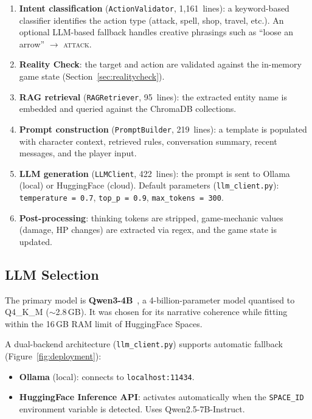 \documentclass[12pt,a4paper]{article}
\begin{document}
\begin{enumerate}[noitemsep]
    \item \textbf{Intent classification} (\texttt{ActionValidator},
          1,161~lines): a keyword-based classifier identifies the action type
          (attack, spell, shop, travel, etc.). An optional LLM-based fallback
          handles creative phrasings such as ``loose an arrow''
          $\rightarrow$ \textsc{attack}.
    \item \textbf{Reality Check}: the target and action are validated against
          the in-memory game state (Section~\ref{sec:realitycheck}).
    \item \textbf{RAG retrieval} (\texttt{RAGRetriever}, 95~lines): the
          extracted entity name is embedded and queried against the ChromaDB
          collections.
    \item \textbf{Prompt construction} (\texttt{PromptBuilder}, 219~lines): a
          template is populated with character context, retrieved rules,
          conversation summary, recent messages, and the player input.
    \item \textbf{LLM generation} (\texttt{LLMClient}, 422~lines): the prompt
          is sent to Ollama (local) or HuggingFace (cloud). Default parameters
          (\texttt{llm\_client.py}): \texttt{temperature\,=\,0.7},
          \texttt{top\_p\,=\,0.9}, \texttt{max\_tokens\,=\,300}.
    \item \textbf{Post-processing}: thinking tokens are stripped,
          game-mechanic values (damage, HP changes) are extracted via regex,
          and the game state is updated.
\end{enumerate}

\subsection{LLM Selection}
\label{sec:llm}

The primary model is \textbf{Qwen3-4B}~\cite{bai2023qwen}, a
4-billion-parameter model quantised to Q4\_K\_M (${\sim}$2.8\,GB). It was
chosen for its narrative coherence while fitting within the 16\,GB RAM limit
of HuggingFace Spaces.

A dual-backend architecture (\texttt{llm\_client.py}) supports automatic
fallback (Figure~\ref{fig:deployment}):
\begin{itemize}[noitemsep]
    \item \textbf{Ollama} (local): connects to \texttt{localhost:11434}.
    \item \textbf{HuggingFace Inference API}: activates automatically when
          the \texttt{SPACE\_ID} environment variable is detected. Uses
          Qwen2.5-7B-Instruct.
\end{itemize}
\end{document}
